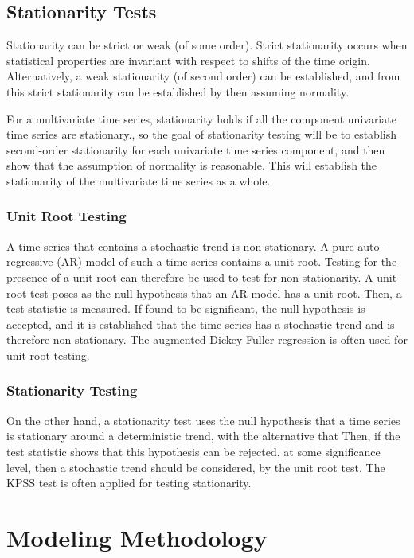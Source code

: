 \documentclass[a4paper]{scrartcl}
\begin{document}
\subsection*{Stationarity Tests}
Stationarity can be strict or weak (of some order). Strict stationarity occurs when statistical properties are invariant with respect to shifts of the time origin\cite{moon2000mathematical}. Alternatively, a weak stationarity (of second order) can be established, and from this strict stationarity can be established by then assuming normality\cite{box_jenkins_reinsel_2008}.

For a multivariate time series, stationarity holds if all the component univariate time series are stationary.\cite{yang2005stationarity}, so the goal of stationarity testing will be to establish second-order stationarity for each univariate time series component, and then show that the assumption of normality is reasonable. This will establish the stationarity of the multivariate time series as a whole.

\subsubsection*{Unit Root Testing}
A time series that contains a stochastic trend is non-stationary. A pure auto-regressive (AR) model of such a time series contains a unit root\cite{franses1998time}. Testing for the presence of a unit root can therefore be used to test for non-stationarity. A unit-root test poses as the null hypothesis that an AR model has a unit root. Then, a test statistic is measured. If found to be significant, the null hypothesis is accepted, and it is established that the time series has a stochastic trend and is therefore non-stationary. The augmented Dickey Fuller regression is often used for unit root testing.

\subsubsection*{Stationarity Testing}
On the other hand, a stationarity test uses the null hypothesis that a time series is stationary around a deterministic trend, with the alternative that  Then, if the test statistic shows that this hypothesis can be rejected, at some significance level, then a stochastic trend should be considered, by the unit root test. The KPSS test is often applied for testing stationarity.

\section*{Modeling Methodology}
\label{sec:modeling_methodology}
\end{document}
